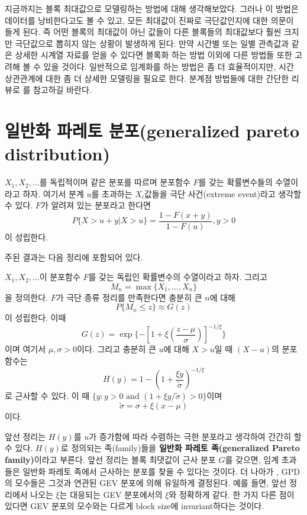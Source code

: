 \documentclass[b5paper,]{scrbook}
\theoremstyle{plain}
\theoremstyle{definition}
\numberwithin{equation}{section}
\let\BeginKnitrBlock\begin \let\EndKnitrBlock\end
\begin{document}
지금까지는 블록 최대값으로 모델링하는 방법에 대해 생각해보았다. 그러나 이 방법은 데이터를 낭비한다고도 볼 수 있고, 모든 최대값이 진짜로 극단값인지에 대한 의문이 들게 된다. 즉 어떤 블록의 최대값이 아닌 값들이 다른 블록들의 최대값보다 훨씬 크지만 극단값으로 뽑히지 않는 상황이 발생하게 된다. 만약 시간별 또는 일별 관측값과 같은 상세한 시계열 자료를 얻을 수 있다면 블록화 하는 방법 이외에 다른 방법들 또한 고려해 볼 수 있을 것이다. 일반적으로 임계화를 하는 방법은 좀 더 효율적이지만, 시간 상관관계에 대한 좀 더 상세한 모델링을 필요로 한다. 분계점 방법들에 대한 간단한 리뷰로 \citep{Scarrott2012}를 참고하길 바란다.

\hypertarget{--generalized-pareto-distribution}{%
\section{일반화 파레토 분포(generalized pareto distribution)}\label{--generalized-pareto-distribution}}

\(X_{1},X_{2},\ldots\)를 독립적이며 같은 분포를 따르며 분포함수 \(F\)를 갖는 확률변수들의 수열이라고 하자. 여기서 분계 \(u\)를 초과하는 \(X_{i}\)값들을 극단 사건(extreme event)라고 생각할 수 있다. \(F\)가 알려져 있는 분포라고 한다면
\[P\{X>u+y|X>u\}=\frac{1-F(x+y)}{1-F(u)}, y>0\]
이 성립한다.

주된 결과는 다음 정리에 포함되어 있다.

\BeginKnitrBlock{theorem}[일반화 파레토 분포]
\protect\hypertarget{thm:unnamed-chunk-452}{}{\label{thm:unnamed-chunk-452} {} }\(X_{1},X_{2},\ldots\)이 분포함수 \(F\)를 갖는 독립인 확률변수의 수열이라고 하자. 그리고
\[M_{n}=\max\{X_{1},\ldots,X_{n}\}\]
을 정의한다. \(F\)가 극단 종류 정리를 만족한다면 충분히 큰 \(n\)에 대해
\[P\{M_{n}\leq z\}\approx G(z)\]
이 성립한다. 이때
\[G(z)=\exp\{-[1+\xi(\frac{z-\mu}{\sigma})]^{-1/\xi}\}\]
이며 여기서 \(\mu, \sigma>0\)이다. 그리고 충분히 큰 \(u\)에 대해 \(X>u\)일 때 \((X-u)\)의 분포함수는
\[
H(y)=1-(1+\frac{\xi y}{\tilde{\sigma}})^{-1/\xi}
\]
로 근사할 수 있다. 이 때 \(\{ y: y > 0 \text{ and } (1+\xi y / \tilde{\sigma}) >0 \}\)이며
\[
\tilde{\sigma}=\sigma + \xi (x-\mu)
\]
이다.
\EndKnitrBlock{theorem}

앞선 정리는 \(H(y)\)를 \(u\)가 증가함에 따라 수렴하는 극한 분포라고 생각하여 간간히 할 수 있다. \(H(y)\)로 정의되는 족(family)들을 \textbf{일반화 파레토 족(generalized Pareto family)}이라고 부른다. 앞선 정리는 블록 최댓값이 근사 분포 \(G\)를 갖으면, 임계 초과들은 일반화 파레토 족에서 근사하는 분포를 찾을 수 있다는 것이다. 더 나아가 , GPD의 모수들은 그것과 연관된 GEV 분포에 의해 유일하게 결정된다. 예를 들면, 앞선 정리에서 나오는 \(\xi\)는 대응되는 GEV 분포에서의 \(\xi\)와 정확하게 같다. 한 가지 다른 점이 있다면 GEV 분포의 모수와는 다르게 block size에 invariant하다는 것이다.
\end{document}
